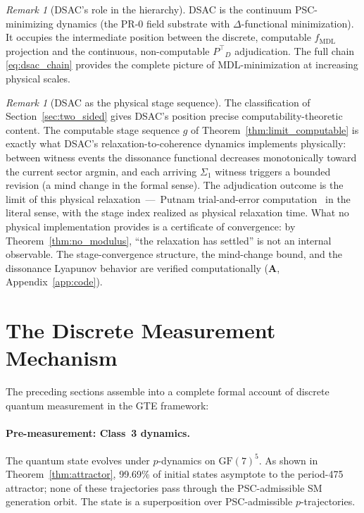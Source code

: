 \documentclass[11pt]{article}
\theoremstyle{remark}
\newtheorem{remark}[theorem]{Remark}
\newcommand{\GF}[1]{\ensuremath{\mathrm{GF}(#1)}}
\newcommand{\fmdl}{\ensuremath{f_{\mathrm{MDL}}}}
\newcommand{\Ptop}{\ensuremath{P^{\top}}}
\newcommand{\CatA}{\textbf{A}}
\begin{document}
\begin{remark}[DSAC's role in the hierarchy]
DSAC is the continuum PSC-minimizing dynamics (the PR-0 field substrate
\cite{SpivackMFRR} with $\Delta$-functional minimization). It occupies
the intermediate position between the discrete, computable \fmdl{} projection
and the continuous, non-computable $\Ptop_D$ adjudication. The full chain
\eqref{eq:dsac_chain} provides the complete picture of MDL-minimization at
increasing physical scales.
\end{remark}

\begin{remark}[DSAC as the physical stage sequence]
\label{rem:dsac_stage}
The classification of Section~\ref{sec:two_sided} gives DSAC's position
precise computability-theoretic content. The computable stage sequence $g$
of Theorem~\ref{thm:limit_computable} is exactly what DSAC's
relaxation-to-coherence dynamics implements physically: between witness
events the dissonance functional decreases monotonically toward the
current sector argmin, and each arriving $\Sigma_1$ witness triggers a
bounded revision (a mind change in the formal sense). The adjudication
outcome is the limit of this physical relaxation~---~Putnam
trial-and-error computation~\cite{Putnam1965} in the literal sense, with
the stage index realized as physical relaxation time. What no physical
implementation provides is a certificate of convergence: by
Theorem~\ref{thm:no_modulus}, ``the relaxation has settled'' is not an
internal observable. The stage-convergence structure, the mind-change
bound, and the dissonance Lyapunov behavior are verified computationally
(\CatA, Appendix~\ref{app:code}).
\end{remark}


\section{The Discrete Measurement Mechanism}
\label{sec:measurement}

The preceding sections assemble into a complete formal account of discrete
quantum measurement in the GTE framework:

\paragraph{Pre-measurement: Class~3 dynamics.}
The quantum state evolves under $p$-dynamics on $\GF{7}^5$. As shown in
Theorem~\ref{thm:attractor}, 99.69\% of initial
states asymptote to the period-475 attractor; none of these trajectories
pass through the PSC-admissible SM generation orbit. The state is a
superposition over PSC-admissible $p$-trajectories.
\end{document}
